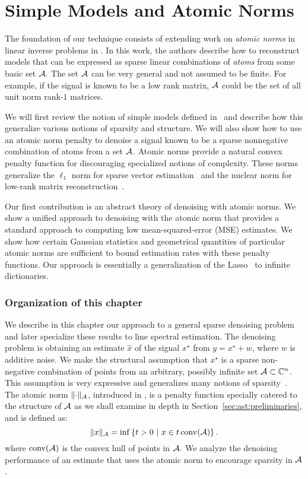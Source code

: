 \chapter{Simple Models and Atomic Norms}
\label{chap:ast}

The foundation of our technique consists of extending work on \emph{atomic
norms} in linear inverse problems in \cite{crpw}. In this work, the authors
describe how to reconstruct models that can be expressed as sparse linear
combinations of \emph{atoms} from some basic set $\mathcal{A}.$ The set $\mathcal{A}$ can be very
general and not assumed to be finite. For example, if the signal is known to be
a low rank matrix, $\mathcal{A}$ could be the set of all unit norm rank-$1$ matrices.

We will first review the notion of simple models defined in~\cite{crpw} and
describe how this generalize various notions of sparsity and structure. We will
also show how to use an atomic norm penalty to denoise a signal known to be a
sparse nonnegative combination of atoms from a set $\mathcal{A}$. Atomic norms provide a
natural convex penalty function for discouraging specialized notions of
complexity. These norms generalize the $\ell_1$ norm for sparse vector
estimation~\cite{candes06} and the nuclear norm for low-rank matrix
reconstruction~\cite{Recht10,CandesRecht09}.

Our first contribution is an abstract theory of denoising with atomic norms. We
show a unified approach to denoising with the atomic norm that provides a
standard approach to computing low mean-squared-error (MSE) estimates. We show
how certain Gaussian statistics and geometrical quantities of particular atomic
norms are sufficient to bound estimation rates with these penalty functions. Our
approach is essentially a generalization of the Lasso~\cite{tibshirani96,chen98}
to infinite dictionaries.

\subsection*{Organization of this chapter}

We describe in this chapter our approach to a general sparse denoising problem
and later specialize these results to line spectral estimation. The denoising
problem is obtaining an estimate $\hat{x}$ of the signal $x^\star$ from $y =
x^\star + w$, where $w$ is additive noise. We make the structural assumption
that $x^\star$ is a sparse non-negative combination of points from an arbitrary,
possibly infinite set $\mathcal{A} \subset \mathbb{C}^n$. This assumption is very expressive and
generalizes many notions of sparsity~\cite{crpw}. The atomic norm
$\lVert\cdot\rVert_{\mathcal{A}}$, introduced in \cite{crpw}, is a penalty function specially
catered to the structure of $\mathcal{A}$ as we shall examine in depth in Section~\ref{sec:ast:preliminaries},
and is defined as:
\begin{equation}
\label{def-atnorm}
\lVert x\rVert_{\mathcal{A}} = \inf\left\{t > 0 ~\middle|~x \in t \operatorname{conv}(\mathcal{A}) \right\}.
\end{equation}
 where $\operatorname{conv}(\mathcal{A})$ is the convex hull
of points in $\mathcal{A}.$ We analyze the denoising performance of an estimate that uses
the atomic norm to encourage sparsity in $\mathcal{A}$.

